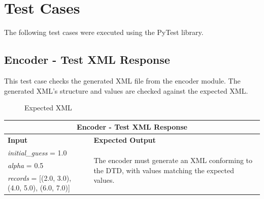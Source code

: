 \section{Test Cases}
The following test cases were executed using the PyTest library.
\subsection{Encoder - Test XML Response}
\begin{flushleft}
This test case checks the generated XML file from the encoder module. 
The generated XML’s structure and values are checked against the expected XML.

\vspace*{1em}

\begin{figure}[h!]
    \centering
    \caption{Expected XML}
    \label{fig:XML output}
  \end{figure}

\vspace*{1em}

\begin{tabular}{ |p{6cm}||p{6cm} |  }
    \hline
    \multicolumn{2}{|c|}{\textbf{Encoder - Test XML Response}} \\
    \hline
    \textbf{Input} & \textbf{Expected Output}\\
    \hline
    \textit{initial\_guess} = 1.0   & \multirow{3}{15em}{The encoder must generate an XML conforming to the DTD, with values matching the expected values.} \\
    \textit{alpha} = 0.5 &   \\
    \textit{records} = [(2.0, 3.0), (4.0, 5.0), (6.0, 7.0)] & \\
    
    \hline
\end{tabular}
\end{flushleft}


